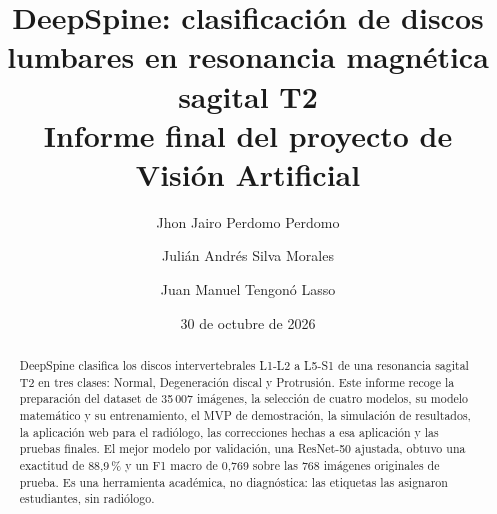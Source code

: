 \documentclass[11pt,a4paper]{article}
\title{DeepSpine: clasificación de discos lumbares en resonancia magnética sagital T2\\[4pt]
\large Informe final del proyecto de Visión Artificial}
\author{Jhon Jairo Perdomo Perdomo \and Julián Andrés Silva Morales \and Juan Manuel Tengonó Lasso}
\date{30 de octubre de 2026}
\begin{document}
\maketitle
\begin{abstract}
DeepSpine clasifica los discos intervertebrales L1-L2 a L5-S1 de una resonancia sagital T2 en tres clases: Normal, Degeneración discal y Protrusión. Este informe recoge la preparación del dataset de 35\,007 imágenes, la selección de cuatro modelos, su modelo matemático y su entrenamiento, el MVP de demostración, la simulación de resultados, la aplicación web para el radiólogo, las correcciones hechas a esa aplicación y las pruebas finales. El mejor modelo por validación, una ResNet-50 ajustada, obtuvo una exactitud de 88,9\,\% y un F1 macro de 0,769 sobre las 768 imágenes originales de prueba. Es una herramienta académica, no diagnóstica: las etiquetas las asignaron estudiantes, sin radiólogo.
\end{abstract}
\tableofcontents
\clearpage













\end{document}

